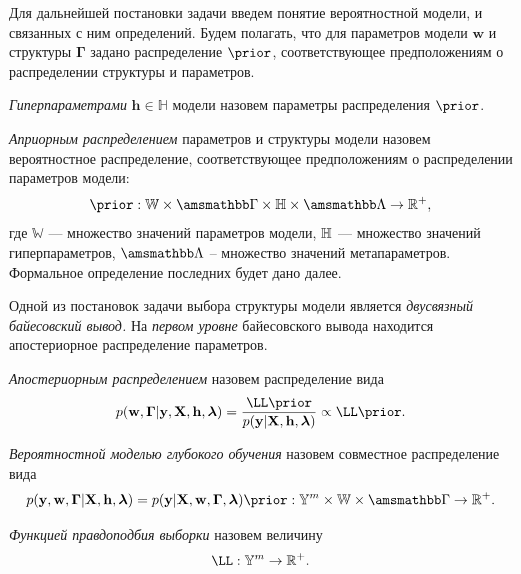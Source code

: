 Для дальнейшей постановки задачи введем понятие вероятностной модели, и связанных с ним определений. Будем полагать, что для параметров модели $\mathbf{w}$ и структуры  $\boldsymbol{\Gamma}$ задано распределение $\prior$, соответствующее предположениям о распределении структуры и параметров. 

\begin{defin}
\textit{Гиперпараметрами} $\mathbf{h}\in \mathbb{H}$ модели  назовем параметры распределения $\prior$.
\end{defin}

\begin{defin}
\textit{Априорным распределением} параметров и структуры модели назовем вероятностное распределение, соответствующее предположениям о распределении параметров модели:
\[
    \prior: \mathbb{W} \times \Gb \times \mathbb{H} \times \Lamb \to \mathbb{R}^{+}, 
\]
где $\mathbb{W}$ --- множество значений параметров модели, $\mathbb{H}$ --- множество значений гиперпараметров, $\Lamb$ -- множество значений метапараметров. Формальное определение последних будет дано далее.
\end{defin}


Одной из постановок задачи выбора структуры модели является \textit{двусвязный байесовский вывод.} 
На \textit{первом уровне} байесовского вывода  находится апостериорное распределение параметров.

\begin{defin}
\textit{Апостериорным распределением} назовем распределение вида
\begin{equation}
\label{eq:posterior}
    \post = \frac{\LL \prior}{\EV} \propto \LL \prior.%
\end{equation}
\end{defin}

\begin{defin}
\textit{Вероятностной моделью глубокого обучения} назовем совместное распределение вида
\[
    p(\y, \mathbf{w},  \boldsymbol{\Gamma}|\X, \mathbf{h}, \lam) = p(\y|\X, \mathbf{w},  \boldsymbol{\Gamma}, \lam)\prior: {\yb}^m \times \mathbb{W}  \times \Gb  \to \mathbb{R}^{+}.
\]
\end{defin}

\begin{defin}
\textit{Функцией правдоподбия выборки } назовем величину
\[
    \LL : {\yb}^m \to \mathbb{R}^{+}.
\]
\end{defin}
 
